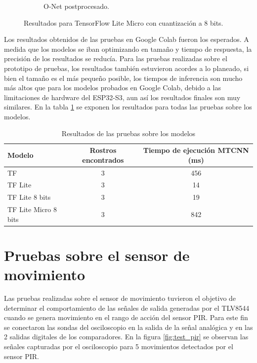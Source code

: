 \begin{figure}[!htpb]
\begin{subfigure}[b]{0.28\textwidth}
         \caption{O-Net postprocesado.}
         \label{fig:2de3}
     \end{subfigure}
     \hfill
        \caption{Resultados para TensorFlow Lite Micro con cuantización a 8 bits.}
        \label{fig:test_tflm}
\end{figure}

Los resultados obtenidos de las pruebas en Google Colab fueron los esperados. A medida que los modelos se iban optimizando en tamaño y tiempo de respuesta, la precisión de los resultados se reducía. Para las pruebas realizadas sobre el prototipo de pruebas, los resultados también estuvieron acordes a lo planeado, si bien el tamaño es el más pequeño posible, los tiempos de inferencia son mucho más altos que para los modelos probados en Google Colab, debido a las limitaciones de hardware del ESP32-S3, aun así los resultados finales son muy similares. En la tabla \ref{tab:test_tf_models} se exponen los resultados para todas las pruebas sobre los modelos.

\begin{table}[h]
	\centering
	\caption[Resultados de las pruebas sobre los modelos]{Resultados de las pruebas sobre los modelos}
	\begin{tabular}{lcc}   
		\toprule
		\textbf{Modelo} & \textbf{Rostros encontrados} & \textbf{Tiempo de ejecución MTCNN (ms)} \\
		\midrule
		TF & 3 & 456 \\
		TF Lite & 3 & 14 \\
		TF Lite 8 bits & 3 & 19 \\
		TF Lite Micro 8 bits & 3 & 842 \\
		\bottomrule
		\hline
	\end{tabular}
	\label{tab:test_tf_models}
\end{table}

\section{Pruebas sobre el sensor de movimiento}
Las pruebas realizadas sobre el sensor de movimiento tuvieron el objetivo de determinar el comportamiento de las señales de salida generadas por el TLV8544 cuando se genera movimiento en el rango de acción del sensor PIR. Para este fin se conectaron las sondas del osciloscopio en la salida de la señal analógica y en las 2 salidas digitales de los comparadores. En la figura \ref{fig:test_pir} se observan las señales capturadas por el osciloscopio para 5 movimientos detectados por el sensor PIR.

